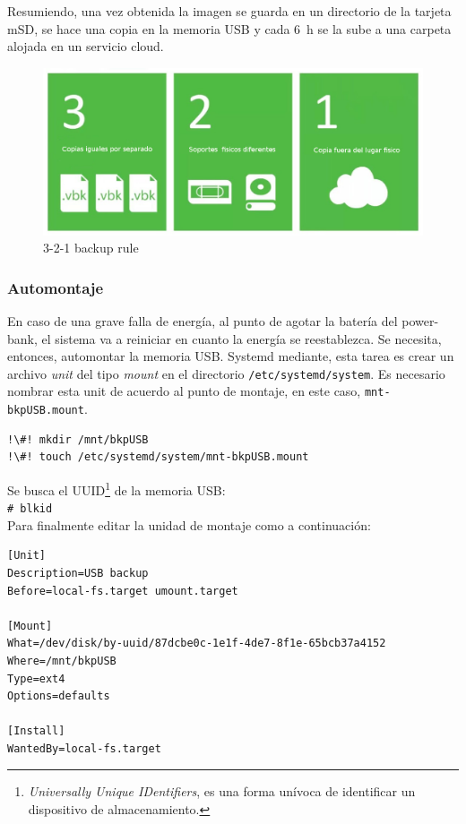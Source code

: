 \documentclass[10pt,a4paper]{article}
\newenvironment{unitFrame}[1][]{%
    \begin{mdframed}[%
        frametitle={#1},
        skipabove=\baselineskip plus 2pt minus 1pt,
        skipbelow=\baselineskip plus 2pt minus 1pt,
        linewidth=0.5pt,
        frametitlerule=true,
        frametitlebackgroundcolor=gray!10
    ]%
}{%
    \end{mdframed}
}
\begin{document}
Resumiendo, una vez obtenida la imagen se guarda en un directorio de la tarjeta mSD, se hace una copia en la memoria USB y cada \SI{6}{h} se la sube a una carpeta alojada en un servicio cloud.

\begin{figure}
\centering
    \includegraphics[scale=0.2]{321backup.jpg}
    \caption{3-2-1 backup rule}
    \label{fig:321bkp}
\end{figure}

\subsubsection{Automontaje}

En caso de una grave falla de energ\'ia, al punto de agotar la bater\'ia del power-bank, el sistema va a reiniciar en cuanto la energ\'ia se reestablezca. Se necesita, entonces, automontar la memoria USB. Systemd mediante, esta tarea es crear un archivo \emph{unit} del tipo \emph{mount} en el directorio \texttt{/etc/systemd/system}. Es necesario nombrar esta unit de acuerdo al punto de montaje, en este caso, \texttt{mnt-bkpUSB.mount}.

\begin{lstlisting}
!\#! mkdir /mnt/bkpUSB
!\#! touch /etc/systemd/system/mnt-bkpUSB.mount
\end{lstlisting}

Se busca el UUID\footnote{\emph{Universally Unique IDentifiers}, es una forma un\'ivoca de identificar un dispositivo de almacenamiento.} de la memoria USB:\\
\lstinline{# blkid}\\

Para finalmente editar la unidad de montaje como a continuaci\'on:

\begin{scriptsize}
\begin{unitFrame}[/etc/systemd/system/mnt-bkpUSB.mount]
\begin{verbatim}
[Unit]
Description=USB backup
Before=local-fs.target umount.target

[Mount]
What=/dev/disk/by-uuid/87dcbe0c-1e1f-4de7-8f1e-65bcb37a4152
Where=/mnt/bkpUSB
Type=ext4
Options=defaults

[Install]
WantedBy=local-fs.target
\end{verbatim}
\end{unitFrame}
\end{scriptsize}
\end{document}
